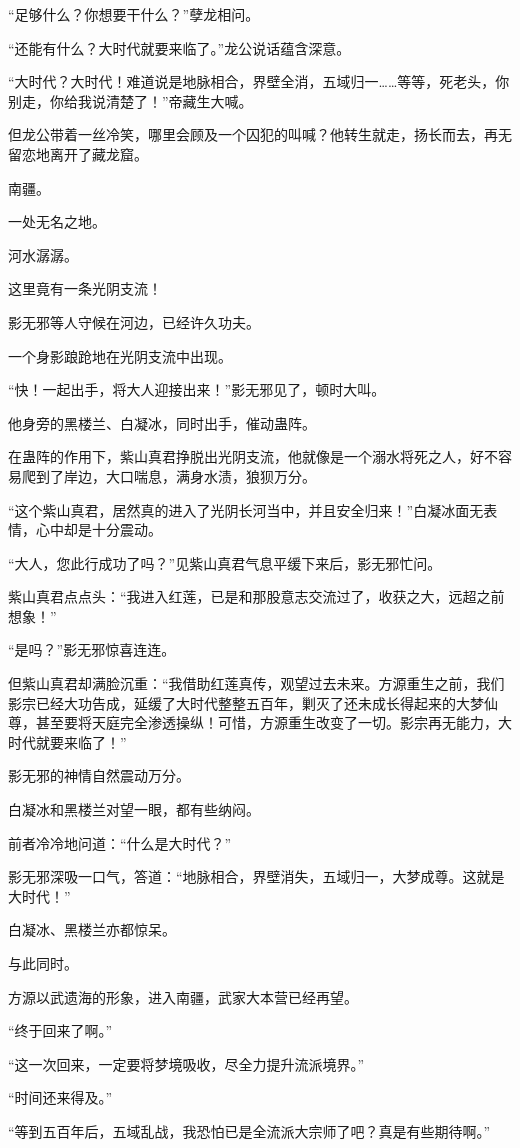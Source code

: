 \begin{this_body}
“足够什么？你想要干什么？”孽龙相问。

“还能有什么？大时代就要来临了。”龙公说话蕴含深意。

“大时代？大时代！难道说是地脉相合，界壁全消，五域归一……等等，死老头，你别走，你给我说清楚了！”帝藏生大喊。

但龙公带着一丝冷笑，哪里会顾及一个囚犯的叫喊？他转生就走，扬长而去，再无留恋地离开了藏龙窟。

南疆。

一处无名之地。

河水潺潺。

这里竟有一条光阴支流！

影无邪等人守候在河边，已经许久功夫。

一个身影踉跄地在光阴支流中出现。

“快！一起出手，将大人迎接出来！”影无邪见了，顿时大叫。

他身旁的黑楼兰、白凝冰，同时出手，催动蛊阵。

在蛊阵的作用下，紫山真君挣脱出光阴支流，他就像是一个溺水将死之人，好不容易爬到了岸边，大口喘息，满身水渍，狼狈万分。

“这个紫山真君，居然真的进入了光阴长河当中，并且安全归来！”白凝冰面无表情，心中却是十分震动。

“大人，您此行成功了吗？”见紫山真君气息平缓下来后，影无邪忙问。

紫山真君点点头：“我进入红莲，已是和那股意志交流过了，收获之大，远超之前想象！”

“是吗？”影无邪惊喜连连。

但紫山真君却满脸沉重：“我借助红莲真传，观望过去未来。方源重生之前，我们影宗已经大功告成，延缓了大时代整整五百年，剿灭了还未成长得起来的大梦仙尊，甚至要将天庭完全渗透操纵！可惜，方源重生改变了一切。影宗再无能力，大时代就要来临了！”

影无邪的神情自然震动万分。

白凝冰和黑楼兰对望一眼，都有些纳闷。

前者冷冷地问道：“什么是大时代？”

影无邪深吸一口气，答道：“地脉相合，界壁消失，五域归一，大梦成尊。这就是大时代！”

白凝冰、黑楼兰亦都惊呆。

与此同时。

方源以武遗海的形象，进入南疆，武家大本营已经再望。

“终于回来了啊。”

“这一次回来，一定要将梦境吸收，尽全力提升流派境界。”

“时间还来得及。”

“等到五百年后，五域乱战，我恐怕已是全流派大宗师了吧？真是有些期待啊。”

\end{this_body}

